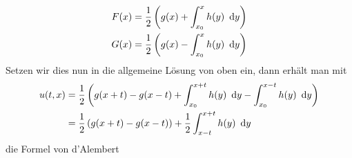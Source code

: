 \begin{exercisePage}
\begin{enumerate}[label=(zu \alph*), leftmargin=*]
\begin{equation*}
			\begin{aligned}
				F(x) &= \frac{1}{2} \left( g(x) + \int_{x_0}^x h(y) \enskip \mathrm{d}y \right) \\
				G(x) &= \frac{1}{2} \left( g(x) - \int_{x_0}^x h(y) \enskip \mathrm{d}y \right)
			\end{aligned}
		\end{equation*}
		Setzen wir dies nun in die allgemeine Lösung von oben ein, dann erhält man mit
		\begin{align*}
			u(t,x) &= \frac{1}{2} \left(  g(x+t) - g(x-t) + \int_{x_0}^{x+t} h(y) \enskip \mathrm{d}y - \int_{x_0}^{x-t} h(y) \enskip \mathrm{d}y  \right) \\
			&= \frac{1}{2} \left(  g(x+t) - g(x-t) \right) + \frac{1}{2} \int_{x-t}^{x+t} h(y) \enskip \mathrm{d}y
		\end{align*}
		die Formel von d'Alembert
	\end{enumerate}

\end{exercisePage}